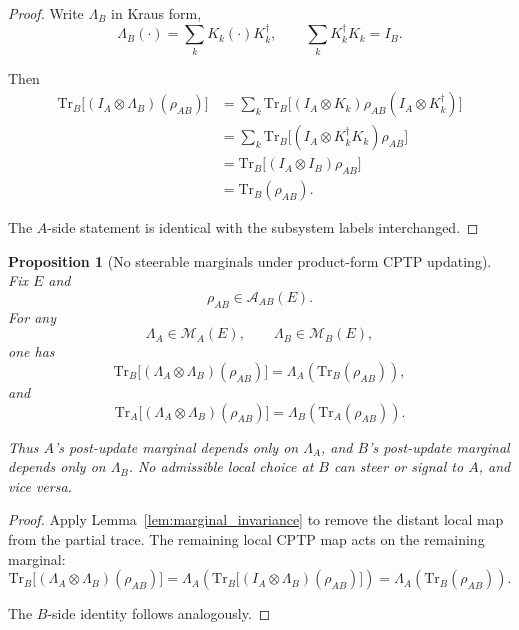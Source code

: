 \documentclass[aps,prx,onecolumn,11pt]{revtex4-2}
\theoremstyle{plain}
\newtheorem{proposition}{Proposition}
\theoremstyle{definition}
\theoremstyle{remark}
\begin{document}
\begin{proof}
Write \(\Lambda_B\) in Kraus form,
\[
\Lambda_B(\cdot)
=
\sum_k K_k(\cdot)K_k^\dagger,
\qquad
\sum_k K_k^\dagger K_k=I_B.
\]

Then
\begin{align*}
\mathrm{Tr}_B\!\bigl[
(I_A\otimes\Lambda_B)(\rho_{AB})
\bigr]
&=
\sum_k
\mathrm{Tr}_B\!\bigl[
(I_A\otimes K_k)\rho_{AB}(I_A\otimes K_k^\dagger)
\bigr]
\\
&=
\sum_k
\mathrm{Tr}_B\!\bigl[
(I_A\otimes K_k^\dagger K_k)\rho_{AB}
\bigr]
\\
&=
\mathrm{Tr}_B\!\bigl[
(I_A\otimes I_B)\rho_{AB}
\bigr]
\\
&=
\mathrm{Tr}_B(\rho_{AB}).
\end{align*}

The \(A\)-side statement is identical with the subsystem labels
interchanged.
\end{proof}

\begin{proposition}[No steerable marginals under product-form CPTP updating]
\label{prop:no_steerable_marginals}
Fix \(E\) and
\[
\rho_{AB}\in\mathcal A_{AB}(E).
\]
For any
\[
\Lambda_A\in\mathcal M_A(E),
\qquad
\Lambda_B\in\mathcal M_B(E),
\]
one has
\[
\mathrm{Tr}_B\!\bigl[
(\Lambda_A\otimes\Lambda_B)(\rho_{AB})
\bigr]
=
\Lambda_A\!\left(
\mathrm{Tr}_B(\rho_{AB})
\right),
\]
and
\[
\mathrm{Tr}_A\!\bigl[
(\Lambda_A\otimes\Lambda_B)(\rho_{AB})
\bigr]
=
\Lambda_B\!\left(
\mathrm{Tr}_A(\rho_{AB})
\right).
\]

Thus \(A\)'s post-update marginal depends only on \(\Lambda_A\), and
\(B\)'s post-update marginal depends only on \(\Lambda_B\). No
admissible local choice at \(B\) can steer or signal to \(A\), and
vice versa.
\end{proposition}

\begin{proof}
Apply Lemma~\ref{lem:marginal_invariance} to remove the distant local
map from the partial trace. The remaining local CPTP map acts on the
remaining marginal:
\[
\mathrm{Tr}_B\!\bigl[
(\Lambda_A\otimes\Lambda_B)(\rho_{AB})
\bigr]
=
\Lambda_A\!\left(
\mathrm{Tr}_B\!\bigl[
(I_A\otimes\Lambda_B)(\rho_{AB})
\bigr]
\right)
=
\Lambda_A\!\left(
\mathrm{Tr}_B(\rho_{AB})
\right).
\]

The \(B\)-side identity follows analogously.
\end{proof}
\end{document}
